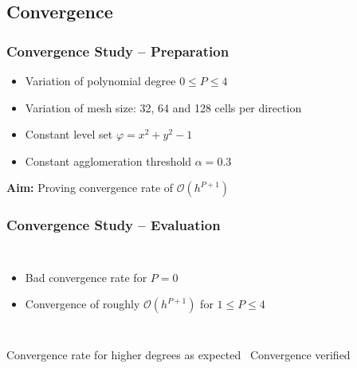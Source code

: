 	\subsection{Convergence}
	\begin{frame}
		\frametitle{Convergence Study -- Preparation}
		\begin{itemize}
			\item Variation of polynomial degree $ 0 \leq P \leq 4$
			\pause
			\item Variation of mesh size: 32, 64 and 128 cells per direction
			\pause
			\item Constant level set $\varphi  = x^2 + y^2 -1$
			\pause
			\item Constant agglomeration threshold $\alpha = 0.3$
		\end{itemize}
		\vspace{0.5cm}
		\pause
		\begin{center}
			\large
			\textbf{Aim:} Proving convergence rate of $\mathcal{O}(h^{P+1})$
		\end{center}
	\end{frame}
	\begin{frame}
		\frametitle{Convergence Study -- Evaluation}
		\begin{columns}[t]
			\column[]{4cm}
			\begin{itemize}
				\item Bad convergence rate for $P=0$
				\pause
				\item Convergence of roughly $\mathcal{O}(h^{P+1})$ for $ 1 \leq P \leq 4$
			\end{itemize}
			\column[]{8cm}
			\onslide
		\begin{figure}[htp]
			\vspace{-1cm}
			\centering		
			
		\end{figure}
		\end{columns}
		\pause
			\begin{center}
				\large
				Convergence rate for higher degrees as expected \newline \MVRightarrow \, Convergence verified
			\end{center}
	\end{frame}